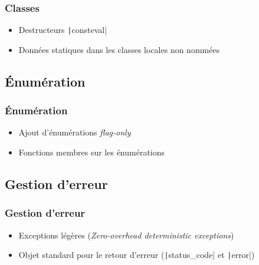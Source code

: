 \documentclass[C++.tex]{subfiles}
\begin{document}
\begin{frame}[fragile]
	\frametitle{Classes}
	\begin{itemize}
		\item Destructeurs \texttt|consteval|
		\item Données statiques dans les classes locales non nommées
	\end{itemize}

\end{frame}

\subsection*{Énumération}
\begin{frame}[fragile]
	\frametitle{Énumération}
	\begin{itemize}
		\item Ajout d'énumérations \textit{flag-only}
		\item Fonctions membres sur les énumérations
	\end{itemize}

\end{frame}

\subsection*{Gestion d'erreur}
\begin{frame}[fragile]
	\frametitle{Gestion d'erreur}
	\begin{itemize}
		\item Exceptions légères (\textit{Zero-overhead deterministic exceptions})
		\item Objet standard pour le retour d'erreur (\texttt|status_code| et \texttt|error|)
	\end{itemize}

\end{frame}
\end{document}
